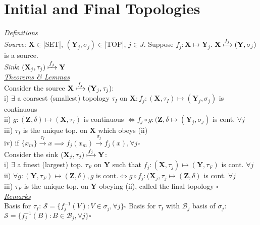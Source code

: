 \section{Initial and Final Topologies}
\underline{\emph{Definitions}}\\
\emph{Source}: $\mathbf{X}\in$|SET|, $(\mathbf{Y}_j,\sigma_j)\in$|TOP|, $j\in J$. Suppose $f_j:\mathbf{X}\mapsto\mathbf{Y}_j$. $\mathbf{X}\xmapsto{f_j}(\mathbf{Y},\sigma_j)$ is a source.\\
\emph{Sink}: $(\mathbf{X}_j,\tau_j)\xmapsto{f_j}\mathbf{Y}$
\\\underline{\emph{Theorems \& Lemmas}}\\
Consider the source $\mathbf{X}\xmapsto{f_j}(\mathbf{Y}_j,\tau_j)$:\\
i) $\exists$ a coarsest (smallest) topology $\tau_I$ on $\mathbf{X}:f_j:(\mathbf{X},\tau_I)\mapsto(\mathbf{Y}_j,\sigma_j)$ is continuous\\
ii) $g:(\mathbf{Z},\delta)\mapsto(\mathbf{X},\tau_I)$ is continuous $\iff f_j\circ g:(\mathbf{Z},\delta\mapsto(\mathbf{Y}_j,\sigma_j)$ is cont. $\forall j$\\
iii) $\tau_I$ is the unique top. on $\mathbf{X}$ which obeys (ii)\\
iv) if $\{x_m\}\xrightarrow{\tau_I}x\implies f_j(x_m)\xrightarrow{\sigma_j}f_j(x),\forall j\square$\\
Consider the sink $(\mathbf{X}_j,\tau_j)\xmapsto{f_j}\mathbf{Y}$:\\
i) $\exists$ a finest (largest) top. $\tau_F$ on $\mathbf{Y}$ such that $f_j:(\mathbf{X},\tau_j)\mapsto(\mathbf{Y},\tau_F)$ is cont. $\forall j$\\
ii) $\forall g:(\mathbf{Y},\tau_F)\mapsto(\mathbf{Z},\delta), g$ is cont.$\iff g\circ f_j:(\mathbf{X}_j,\tau_j\mapsto(\mathbf{Z},\delta)$ is cont. $\forall j$\\
iii) $\tau_F$ is the unique top. on $\mathbf{Y}$ obeying (ii), called the final topology $\square$
\\\underline{\emph{Remarks}}\\
Basis for $\tau_I$: $\mathcal{S}=\{f_j^{-1}(V):V\in\sigma_j,\forall
j\}\square$
Basis for $\tau_I$ with $\mathcal{B}_j$ basis of $\sigma_j$: $\mathcal{S}=\{f_j^{-1}(B):B\in\mathcal{B}_j,\forall j\}\square$
